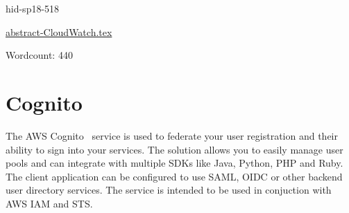 





\begin{IU}

hid-sp18-518

\href{https://github.com/cloudmesh-community/hid-sp18-518/blob/master//technology/abstract-CloudWatch.tex}{abstract-CloudWatch.tex}

 

Wordcount: 440

\end{IU}

\section{Cognito}

The AWS Cognito~\cite{hid-sp18-518-Cognito} service is used to federate your
user registration and their ability to sign into your services. The solution
allows you to easily manage user pools and can integrate with multiple SDKs 
like Java, Python, PHP and Ruby. The client application can be configured to
use SAML, OIDC or other backend user directory services. The service is 
intended to be used in conjuction with AWS IAM and STS.


